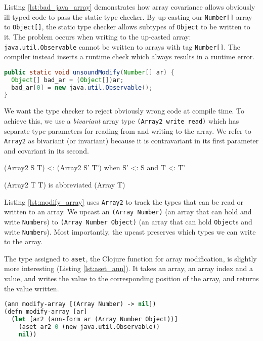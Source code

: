 \documentclass[preprint]{sigplanconf}
\begin{document}
Listing \ref{lst:bad_java_array} demonstrates how array covariance allows
obviously ill-typed code to pass the static type checker.
By up-casting our \lstinline|Number[]| array to \lstinline|Object[]|,
the static type checker allows subtypes of \lstinline|Object|
to be written to it.
The problem occurs when writing to the up-casted array:
\lstinline|java.util.Observable| cannot be written to arrays with tag \lstinline|Number[]|.
The compiler instead inserts a runtime check which always results in a runtime error.

\begin{lstlisting}[language=java, label=lst:bad_java_array, caption=Statically unsound Java array manipulation]
public static void unsoundModify(Number[] ar) {
  Object[] bad_ar = (Object[])ar;
  bad_ar[0] = new java.util.Observable();
}
\end{lstlisting}

We want the type checker to reject obviously wrong code at compile time.
To achieve this, we use a \emph{bivariant} array type
\lstinline|(Array2 write read)| which has separate type parameters for
reading from and writing to the array. We refer to \lstinline|Array2| as bivariant (or invariant)
because it is contravariant in its first parameter and covariant in its second.

\begin{verb}
(Array2 S T) <: (Array2 S' T') 
  when S' <: S and T <: T'

(Array2 T T) is abbreviated (Array T)
\end{verb}

Listing \ref{lst:modify_array} uses \lstinline|Array2|
to track the types that can be read or written to an array.
We upcast an \lstinline|(Array Number)| (an array that can hold and write \lstinline|Number|s)
to \lstinline|(Array Number Object)| (an array that can hold \lstinline|Object|s and write
\lstinline|Number|s).
Most importantly, the upcast preserves which types we can write to the array.

The type assigned to \lstinline|aset|, the Clojure function for array modification, is slightly more interesting
(Listing \ref{lst:aset_ann}).
It takes an array, an array index and a value, and writes the value to the corresponding position of the array,
and returns the value written.

\begin{lstlisting}[language=lisp, label=lst:modify_array, caption=A type error with bivariant array types in core.typed]
(ann modify-array [(Array Number) -> nil])
(defn modify-array [ar]
  (let [ar2 (ann-form ar (Array Number Object))]
    (aset ar2 0 (new java.util.Observable))
    nil))
\end{lstlisting}
\end{document}
